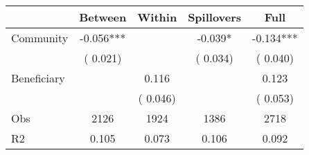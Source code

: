 
\begin{tabular}{l*{4}{c}}\hline&\multicolumn{1}{c}{Between}&\multicolumn{1}{c}{Within}&\multicolumn{1}{c}{Spillovers}&\multicolumn{1}{c}{Full}\\ \hline
 Community             &             -0.056***      &                                               &       -0.039* &        -0.134***                            \\ 
                               &        (       0.021)           &                                       &       (       0.034)     &      (       0.040)                                           \\ 
 Beneficiary   &                                               &        0.116    &                                &             0.123                            \\ 
                               &                                               & (       0.046)                  &                                        &      (       0.053)                                           \\ 
\hline                                                                                                                                                                                                                                            
 Obs                   &               2126               &       1924                       &       1386                &              2718                                               \\ 
 R2                    &                      0.105              &              0.073                      &              0.106               &                     0.092                                              \\ 
\hline \end{tabular}                                                                                                                                                                                                              